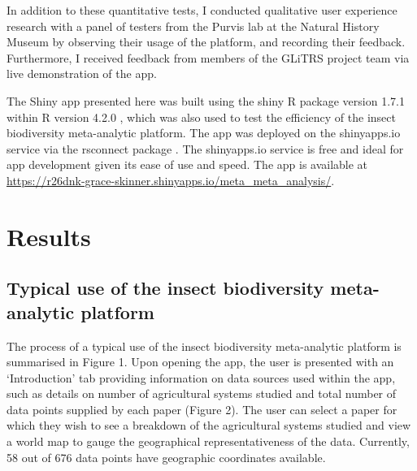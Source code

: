 \documentclass[11pt]{article}
\begin{document}
		\noindent In addition to these quantitative tests, I conducted qualitative user experience research with a panel of testers from the Purvis lab at the Natural History Museum by observing their usage of the platform, and recording their feedback. Furthermore, I received feedback from members of the GLiTRS project team via live demonstration of the app.
		
		\noindent The Shiny app presented here was built using the shiny R package version 1.7.1 \citep{chang2022shiny} within R version 4.2.0 \citep{team2013r}, which was also used to test the efficiency of the insect biodiversity meta-analytic platform. The app was deployed on the shinyapps.io service via the rsconnect package \citep{atkins2019rsconnect}. The shinyapps.io service is free and ideal for app development given its ease of use and speed. The app is available at \url{https://r26dnk-grace-skinner.shinyapps.io/meta_meta_analysis/}. 
		
		\clearpage 
		
		\section{Results}
		\subsection{Typical use of the insect biodiversity meta-analytic platform} 
		The process of a typical use of the insect biodiversity meta-analytic platform is summarised in Figure 1. Upon opening the app, the user is presented with an ‘Introduction’ tab providing information on data sources used within the app, such as details on number of agricultural systems studied and total number of data points supplied by each paper (Figure 2). The user can select a paper for which they wish to see a breakdown of the agricultural systems studied and view a world map to gauge the geographical representativeness of the data. Currently, 58 out of 676 data points have geographic coordinates available.
		
\end{document}
